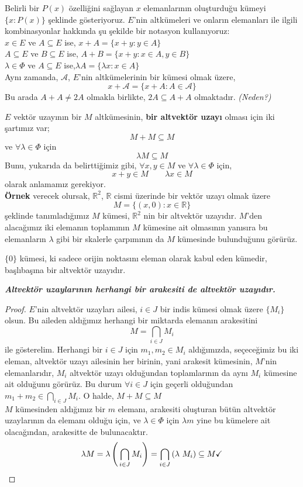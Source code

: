 \documentclass[11pt]{article}
\theoremstyle{plain}
\theoremstyle{definition}
\theoremstyle{remark}
\numberwithin{equation}{section}
\renewcommand{\%}{{\small \%}}
\begin{document}
Belirli bir $P(x)$ özelliğini sağlayan $x$ elemanlarının oluşturduğu kümeyi $\{x:P(x)\}$ şeklinde gösteriyoruz. $E$'nin altkümeleri ve onların elemanları ile ilgili kombinasyonlar hakkında şu şekilde bir notasyon kullanıyoruz:\\[3pt]
$x\in E$ ve $A\subseteq E$ ise, \quad $x+A=\{x+y:y\in A\}$\\[2pt]
$A\subseteq E$ ve $B\subseteq E$ ise, \quad $A+B=\{x+y:x\in A, y\in B\}$\\[2pt]
$\lambda\in\Phi$ ve $A\subseteq E$ ise,\quad $\lambda A=\{\lambda x:x\in A\}$\\[2pt]
Aynı zamanda, $\mathscr{A}$, $E$'nin altkümelerinin bir kümesi olmak üzere, \[x+\mathscr{A}=\{x+A:A\in \mathscr{A}\}\]
Bu arada $A+A\neq2A$ olmakla birlikte, $2A\subseteq A+A$ olmaktadır. \emph{(Neden?)}

$E$ vektör uzayının bir $M$ altkümesinin, \textbf{bir altvektör uzayı} olması için iki şartımız var;
\begin{equation}
M+M\subseteq M 
\end{equation}
ve $\forall\lambda\in\Phi$ için 
\begin{equation} \lambda M\subseteq M
\end{equation}
Bunu, yukarıda da belirttiğimiz gibi, $\forall x,y\in M$ ve $\forall\lambda\in\Phi$ için,
\[
x+y\in M\qquad \lambda x\in M
\]olarak anlamamız gerekiyor.\\[7pt]

\textbf{Örnek} verecek olursak, $\mathbb{R}^2$, $\mathbb{R}$ cismi üzerinde bir vektör uzayı olmak üzere
\[M=\{(x,0):x\in\mathbb{R}\}\]
şeklinde tanımladığımız $M$ kümesi, $\mathbb{R}^2$ nin bir altvektör uzayıdır. $M$'den alacağımız iki elemanın toplamının $M$ kümesine ait olmasının yanısıra bu elemanların $\lambda$ gibi bir skalerle çarpımının da $M$ kümesinde bulunduğunu görürüz.

$\{0\}$ kümesi, ki sadece orijin noktasını eleman olarak kabul eden kümedir, başlıbaşına bir altvektör uzayıdır.\newpage

\emph{\textbf{Altvektör uzaylarının herhangi bir arakesiti de altvektör uzayıdır.}}
\begin{proof}
$E$'nin altvektör uzayları ailesi, $i\in J$ bir indis kümesi olmak üzere $\{M_i\}$ olsun. Bu aileden aldığımız herhangi bir miktarda elemanın arakesitini
\[
M=\bigcap_{i\in J} M_i
\] ile gösterelim. Herhangi bir $ i\in J$ için $m_{1},m_2\in M_i$ aldığımızda, seçeceğimiz bu iki eleman, altvektör uzayı ailesinin her birinin, yani arakesit kümesinin, $M$'nin  elemanlarıdır, $M_i$ altvektör uzayı olduğundan toplamlarının da aynı $M_i$ kümesine ait olduğunu görürüz.  Bu durum $\forall i\in J$ için geçerli olduğundan $m_{1}+m_{2}\in\bigcap_{i\in J} M_i$. O halde, $M+M\subseteq M$\checkmark \\[5pt]
$M$ kümesinden aldığımız bir $m$ elemanı, arakesiti oluşturan bütün altvektör uzaylarının da elemanı olduğu için, ve $\lambda\in\Phi$ için $\lambda m$ yine bu kümelere ait olacağından, arakesitte de bulunacaktır. 
\[
\lambda M=\lambda\left(\vphantom{1}\bigcap_{i\in J} M_i\right)=\bigcap_{i\in J}\left(\lambda\ M_i\right)\subseteq M \checkmark \\[5pt]
\]
\end{proof}
\end{document}
